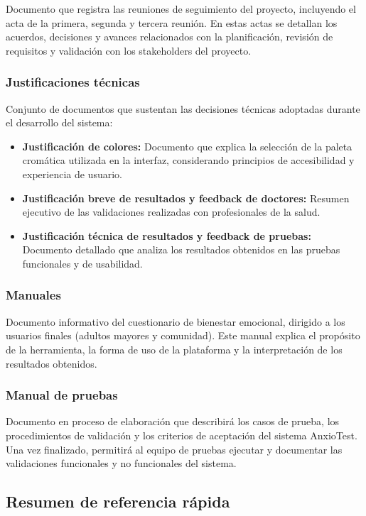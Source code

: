 Documento que registra las reuniones de seguimiento del proyecto, incluyendo el acta de la primera, segunda y tercera reunión. En estas actas se detallan los acuerdos, decisiones y avances relacionados con la planificación, revisión de requisitos y validación con los stakeholders del proyecto.

\subsubsection{Justificaciones técnicas}

Conjunto de documentos que sustentan las decisiones técnicas adoptadas durante el desarrollo del sistema:
\begin{itemize}
  \item \textbf{Justificación de colores:} Documento que explica la selección de la paleta cromática utilizada en la interfaz, considerando principios de accesibilidad y experiencia de usuario.
  \item \textbf{Justificación breve de resultados y feedback de doctores:} Resumen ejecutivo de las validaciones realizadas con profesionales de la salud.
  \item \textbf{Justificación técnica de resultados y feedback de pruebas:} Documento detallado que analiza los resultados obtenidos en las pruebas funcionales y de usabilidad.
\end{itemize}

\subsubsection{Manuales}

Documento informativo del cuestionario de bienestar emocional, dirigido a los usuarios finales (adultos mayores y comunidad). Este manual explica el propósito de la herramienta, la forma de uso de la plataforma y la interpretación de los resultados obtenidos.

\subsubsection{Manual de pruebas}

Documento en proceso de elaboración que describirá los casos de prueba, los procedimientos de validación y los criterios de aceptación del sistema AnxioTest. Una vez finalizado, permitirá al equipo de pruebas ejecutar y documentar las validaciones funcionales y no funcionales del sistema.

\subsection{Resumen de referencia rápida}
\label{sec:referencia_rapida}

